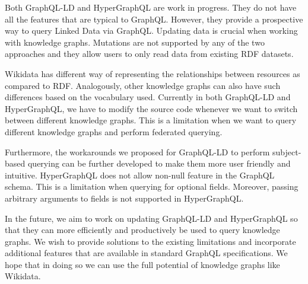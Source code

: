 Both GraphQL-LD and HyperGraphQL are work in progress. They do not have all the features that are typical to GraphQL. However, they provide a prospective way to query Linked Data via GraphQL. Updating data is crucial when working with knowledge graphs. Mutations are not supported by any of the two approaches and they allow users to only read data from existing RDF datasets. 

Wikidata has different way of representing the relationships between resources as compared to RDF. Analogously, other knowledge graphs can also have such differences based on the vocabulary used. Currently in both GraphQL-LD and HyperGraphQL, we have to modify the source code whenever we want to switch between different knowledge graphs. This is a limitation when we want to query different knowledge graphs and perform federated querying.

Furthermore, the workarounds we proposed for GraphQL-LD to perform subject-based querying can be further developed to make them more user friendly and intuitive. HyperGraphQL does not allow non-null feature in the GraphQL schema. This is a limitation when querying for optional fields. Moreover, passing arbitrary arguments to fields is not supported in HyperGraphQL.

In the future, we aim to work on updating GraphQL-LD and HyperGraphQL so that they can more efficiently and productively be used to query knowledge graphs. We wish to provide solutions to the existing limitations and incorporate additional features that are available in standard GraphQL specifications. We hope that in doing so we can use the full potential of knowledge graphs like Wikidata. 
